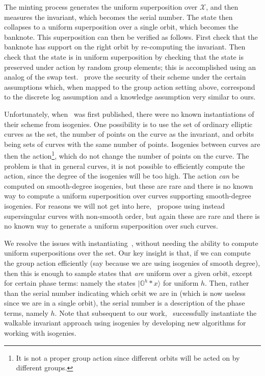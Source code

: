 \documentclass{article}\usepackage[a4paper,margin=20mm]{geometry}
\numberwithin{theorem}{section}
\numberwithin{equation}{section}
\newcommand{\G}{\mathbb{G}}
\newcommand{\Xs}{{\mathcal{X}}}
\begin{document}
The minting process generates the uniform superposition over $\Xs$, and then measures the invariant, which becomes the serial number. The state then collapses to a uniform superposition over a single orbit, which becomes the banknote. This superposition can then be verified as follows. First check that the banknote has support on the right orbit by re-computing the invariant. Then check that the state is in uniform superposition by checking that the state is preserved under action by random group elements; this is accomplished using an analog of the swap test.~\cite{EC:LiuMonZha23} prove the security of their scheme under the certain assumptions which, when mapped to the group action setting above, correspond to the discrete log assumption and a knowledge assumption very similar to ours.

Unfortunately, when~\cite{EC:LiuMonZha23} was first published, there were no known instantiations of their scheme from isogenies. One possibility is to use the set of ordinary elliptic curves as the set, the number of points on the curve as the invariant, and orbits being sets of curves with the same number of points. Isogenies between curves are then the action\footnote{It is not a proper group action since different orbits will be acted on by different groups.}, which do not change the number of points on the curve. The problem is that in general curves, it is not possible to efficiently compute the action, since the degree of the isogenies will be too high. The action \emph{can} be computed on smooth-degree isogenies, but these are rare and there is no known way to compute a uniform superposition over curves supporting smooth-degree isogenies. For reasons we will not get into here,~\cite{EC:LiuMonZha23} propose using instead supersingular curves with non-smooth order, but again these are rare and there is no known way to generate a uniform superposition over such curves.

We resolve the issues with instantiating~\cite{EC:LiuMonZha23}, without needing the ability to compute uniform superpositions over the set. Our key insight is that, if we can compute the group action efficiently (say because we are using isogenies of smooth degree), then this is enough to sample states that \emph{are} uniform over a given orbit, except for certain phase terms: namely the states $|\G^h*x\rangle$ for uniform $h$. Then, rather than the serial number indicating which orbit we are in (which is now useless since we are in a single orbit), the serial number is a description of the phase terms, namely $h$. Note that subsequent to our work,~\cite{AC:MonSha24} successfully instantiate the walkable invariant approach using isogenies by developing new algorithms for working with isogenies.
\end{document}
